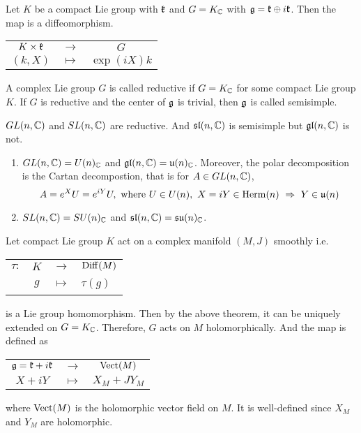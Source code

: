 \documentclass[a4paper,12pt]{article}
\begin{document}
	\begin{thm}
		Let $K$ be a compact Lie group with $\mathfrak{k}$ and $G = K_{\mathbb{C}}$ with $\mathfrak{g} = \mathfrak{k} \oplus i\mathfrak{k}$. Then the map is a diffeomorphism.
		\begin{center}
			\begin{tabular}{c c c}
				$K \times \mathfrak{k}$ & $\longrightarrow$ & $G$ \\
				$(k,X)$ & $\longmapsto$ & $\exp(iX)k$
			\end{tabular}
		\end{center}
	\end{thm}

	\begin{defn}
		A complex Lie group $G$ is called reductive if $G = K_{\mathbb{C}}$ for some compact Lie group $K$. If $G$ is reductive and the center of $\mathfrak{g}$ is trivial, then $\mathfrak{g}$ is called semisimple.
	\end{defn}
	
	\begin{exam}
		$GL(n,\mathbb{C})$ and $SL(n,\mathbb{C})$ are reductive. And $\mathfrak{sl}(n,\mathbb{C})$ is semisimple but $\mathfrak{gl}(n,\mathbb{C})$ is not.
		\begin{enumerate}
			\item $GL(n,\mathbb{C}) = U(n)_{\mathbb{C}}$ and $\mathfrak{gl}(n,\mathbb{C}) = \mathfrak{u}(n)_{\mathbb{C}}$. Moreover, the polar decomposition is the Cartan decompostion, that is for $A \in GL(n,\mathbb{C})$,
			\begin{equation*}
				A = e^XU = e^{iY}U,~\text{where }U \in U(n),~X=iY \in \operatorname{Herm}(n)~\Rightarrow~ Y \in \mathfrak{u}(n)
			\end{equation*}
			\item $SL(n,\mathbb{C}) = SU(n)_{\mathbb{C}}$ and $\mathfrak{sl}(n,\mathbb{C}) = \mathfrak{su}(n)_{\mathbb{C}}$.
		\end{enumerate}
	\end{exam}

	Let compact Lie group $K$ act on a complex manifold $(M,J)$ smoothly i.e.
	\begin{center}
		\begin{tabular}{l c c l}
			$\tau \colon$ & $K$ & $\longrightarrow$ & $\operatorname{Diff}(M)$ \\
			~ & $g$ & $\longmapsto$ & $\tau(g)$
		\end{tabular}
	\end{center}
	is a Lie group homomorphism. Then by the above theorem, it can be uniquely extended on $G = K_{\mathbb{C}}$. Therefore, $G$ acts on $M$ holomorphically. And the map is defined as
	\begin{center}
		\begin{tabular}{c c c}
			$\mathfrak{g} = \mathfrak{k}+i\mathfrak{k}$ & $\longrightarrow$ & $\operatorname{Vect}(M)$ \\
			$X+iY$ & $\longmapsto$ & $X_M+JY_M$
		\end{tabular}
	\end{center}
	where $\operatorname{Vect}(M)$ is the holomorphic vector field on $M$. It is well-defined since $X_M$ and $Y_M$ are holomorphic.
\end{document}
